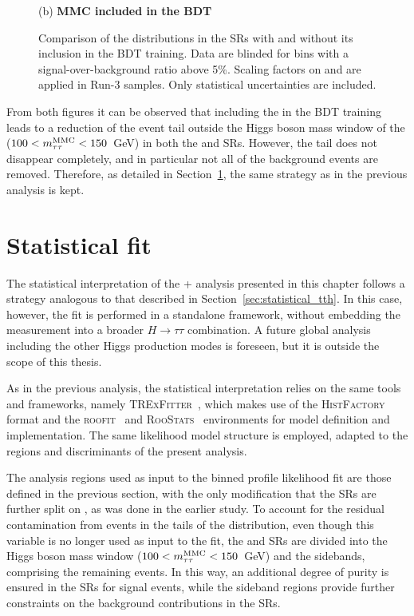 \begin{figure}[htbp]
  \vspace{0.2cm}
  \begin{minipage}{\textwidth}
    \centering
    \small {(b) \textbf{MMC included in the BDT}}
  \end{minipage}
  \vspace{0.35cm}
  \caption{Comparison of the \mmc distributions in the \thqb SRs with and without its inclusion in the BDT training. Data are blinded for bins with a signal-over-background ratio above 5\%. Scaling factors on \ztautau and \ttbar are applied in Run-3 samples. Only statistical uncertainties are included.}
  \label{mmc_distributions_th}
\end{figure}
From both figures it can be observed that including the \mmc in the BDT training leads to a reduction of the event tail outside the Higgs boson mass window of the \mmc ($100 < m^\text{MMC}_{\tau\tau} < 150$~GeV) in both the \thqb and \ttH SRs. However, the tail does not disappear completely, and in particular not all of the \ttbar background events are removed. Therefore, as detailed in Section~\ref{statistical_th_tth}, the same strategy as in the previous analysis is kept.

\section{Statistical fit}
\label{statistical_th_tth}

The statistical interpretation of the \thqb + \ttH analysis presented in this chapter follows a strategy analogous to that described in Section~\ref{sec:statistical_tth}. In this case, however, the fit is performed in a standalone framework, without embedding the measurement into a broader $H \to \tau \tau$ combination. A future global analysis including the other Higgs production modes is foreseen, but it is outside the scope of this thesis.

As in the previous analysis, the statistical interpretation relies on the same tools and frameworks, namely \textsc{TRExFitter}~\cite{trexfitter}, which makes use of the \textsc{HistFactory}~\cite{histfactory} format and the \textsc{roofit}~\cite{roofit} and \textsc{RooStats}~\cite{roostats} environments for model definition and implementation. The same likelihood model structure is employed, adapted to the regions and discriminants of the present analysis.

The analysis regions used as input to the binned profile likelihood fit are those defined in the previous section, with the only modification that the SRs are further split on \mmc, as was done in the earlier study. To account for the residual contamination from \ttbar events in the tails of the \mmc distribution, even though this variable is no longer used as input to the fit, the \ttH and \thqb SRs are divided into the Higgs boson mass window ($100 < m^\text{MMC}_{\tau\tau} < 150$~GeV) and the sidebands, comprising the remaining events. In this way, an additional degree of purity is ensured in the SRs for signal events, while the sideband regions provide further constraints on the background contributions in the SRs.

